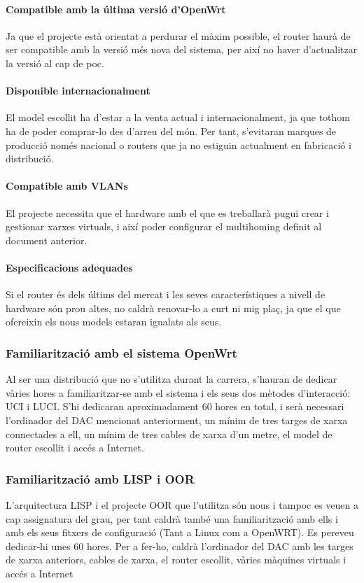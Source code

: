 \documentclass{article}
\begin{document}
\begin{enumerate}
\begin{enumerate}
\begin{enumerate}
\paragraph{Compatible amb la última versió d’OpenWrt}
Ja que el projecte està orientat a perdurar el màxim possible, el router haurà de ser compatible amb la versió més nova del sistema, per així no haver d’actualitzar la versió al cap de poc.
\paragraph{Disponible internacionalment}
El model escollit ha d’estar a la venta actual i internacionalment, ja que tothom ha de poder comprar-lo des d’arreu del món. Per tant, s’evitaran marques de producció només nacional o routers que ja no estiguin actualment en fabricació i distribució.
\paragraph{Compatible amb VLANs}
El projecte necessita que el hardware amb el que es treballarà pugui crear i gestionar xarxes virtuals, i així poder configurar el multihoming definit al document anterior.
\paragraph{Especificacions adequades}
Si el router és dels últims del mercat i les seves característiques a nivell de hardware són prou altes, no caldrà renovar-lo a curt ni mig plaç, ja que el que ofereixin els nous models estaran igualats als seus.
\subsubsection{Familiarització amb el sistema OpenWrt}
Al ser una distribució que no s’utilitza durant la carrera, s’hauran de dedicar vàries hores a familiaritzar-se amb el sistema i els seus dos mètodes d’interacció: UCI i LUCI. S’hi dedicaran aproximadament 60 hores en total, i serà necessari l’ordinador del DAC mencionat anteriorment, un mínim de tres targes de xarxa connectades a ell, un mínim de tres cables de xarxa d’un metre, el model de router escollit i accés a Internet.
\subsubsection{Familiarització amb LISP i OOR}
L’arquitectura LISP i el projecte OOR que l’utilitza són nous i tampoc es veuen a cap assignatura del grau, per tant caldrà també una familiarització amb ells i amb els seus fitxers de configuració (Tant a Linux com a OpenWRT). Es pereveu dedicar-hi unes 60 hores. Per a fer-ho, caldrà l’ordinador del DAC amb les targes de xarxa anteriors, cables de xarxa, el router escollit, vàries màquines virtuals i accés a Internet

\end{enumerate}
\end{enumerate}
\end{enumerate}
\end{document}
